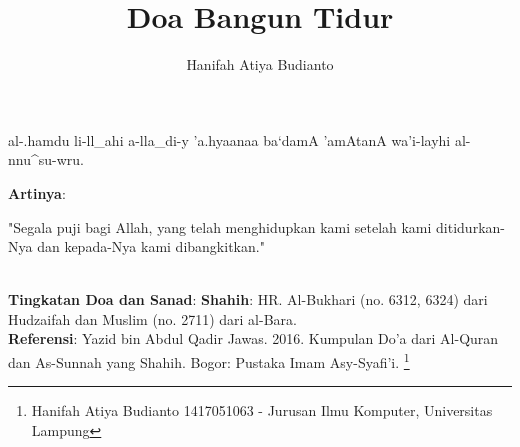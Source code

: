 \documentclass[a4paper,12pt]{article}
\title{\Large Doa Bangun Tidur}
\author{\calligra Hanifah Atiya Budianto}
\begin{document}
\sffamily
\maketitle 
\fullvocalize
{}
\begin{arabtext}
\noindent
al-.hamdu li-ll_ahi a-lla_di-y 'a.hyaanaa ba`damA 'amAtanA wa'i-layhi 
al-nnu^su-wru.\\ 
\end{arabtext}
\noindent
\textbf{Artinya}:
\par
\indent
"Segala puji bagi Allah, yang telah menghidupkan kami setelah kami 
ditidurkan-Nya dan kepada-Nya kami dibangkitkan."\\\\
\par
\noindent
\textbf{Tingkatan Doa dan Sanad}: \textbf{Shahih}: HR. Al-Bukhari (no. 6312,
 6324) dari Hudzaifah dan Muslim (no. 2711) dari al-Bara.\\
\textbf{Referensi}: Yazid bin Abdul Qadir Jawas. 2016. Kumpulan Do'a dari
Al-Quran dan As-Sunnah yang Shahih. Bogor: Pustaka Imam Asy-Syafi'i.
\footnote{Hanifah Atiya Budianto 1417051063 - Jurusan Ilmu Komputer,
Universitas Lampung}
\end{document}
